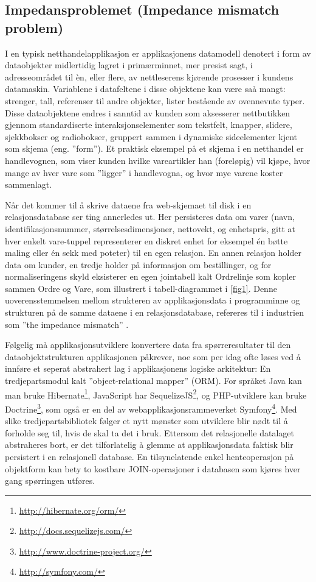 \subsection{Impedansproblemet (Impedance mismatch problem)}

I en typisk netthandelapplikasjon er applikasjonens datamodell denotert i form av dataobjekter midlertidig lagret i primærminnet, mer presist sagt, i adresseområdet til èn, eller flere, av nettleserens kjørende prosesser i kundens datamaskin. Variablene i datafeltene i disse objektene kan være saå mangt: strenger, tall, referenser til andre objekter, lister bestående av ovennevnte typer. Disse dataobjektene endres i sanntid av kunden som aksesserer nettbutikken gjennom standardiserte interaksjonselementer som tekstfelt, knapper, slidere, sjekkbokser og radiobokser, gruppert sammen i dynamiske sideelementer kjent som skjema (eng. ''form''). Et praktisk eksempel på et skjema i en netthandel er handlevognen, som viser kunden hvilke vareartikler han (foreløpig) vil kjøpe, hvor mange av hver vare som ''ligger'' i handlevogna, og hvor mye varene koster sammenlagt.

Når det kommer til å skrive dataene fra web-skjemaet til disk i en relasjonsdatabase ser ting annerledes ut. Her persisteres data om varer (navn, identifikasjonsnummer, størrelses\-dimensjoner, nettovekt, og enhetspris, gitt at hver enkelt vare-tuppel representerer en diskret enhet for eksempel én bøtte maling eller én sekk med poteter) til en egen relasjon. En annen relasjon holder data om kunder, en tredje holder på informasjon om bestillinger, og for normaliseringens skyld eksisterer en egen jointabell kalt Ordrelinje som kopler sammen Ordre og Vare, som illustrert i tabell-diagrammet i \ref{fig1}. Denne uoverensstemmelsen mellom strukteren av applikasjonsdata i programminne og strukturen på de samme dataene i en relasjonsdatabase, refereres til i industrien som ''the impedance mismatch'' \citep{sadalage2013}.

Følgelig må applikasjonsutviklere konvertere data fra spørreresultater til den dataobjektstrukturen applikasjonen påkrever, noe som per idag ofte løses ved å innføre et seperat abstrahert lag i applikasjonens logiske arkitektur: En tredjepartsmodul kalt ''object-relational mapper'' (ORM). For språket Java kan man bruke Hibernate\footnote{\url{http://hibernate.org/orm/}}, JavaScript har SequelizeJS\footnote{\url{http://docs.sequelizejs.com/}}, og PHP-utviklere kan bruke Doctrine\footnote{\url{http://www.doctrine-project.org/}}, som også er en del av webapplikasjonsrammeverket Symfony\footnote{\url{http://symfony.com/}}. Med slike tredjepartsbibliotek følger et nytt mønster som utviklere blir nødt til å forholde seg til, hvis de skal ta det i bruk. Ettersom det relasjonelle datalaget abstraheres bort, er det tilforlatelig å glemme at applikasjonsdata faktisk blir persistert i en relasjonell database. En tilsynelatende enkel henteoperasjon på objektform kan bety to kostbare JOIN-operasjoner i databasen som kjøres hver gang spørringen utføres. %

